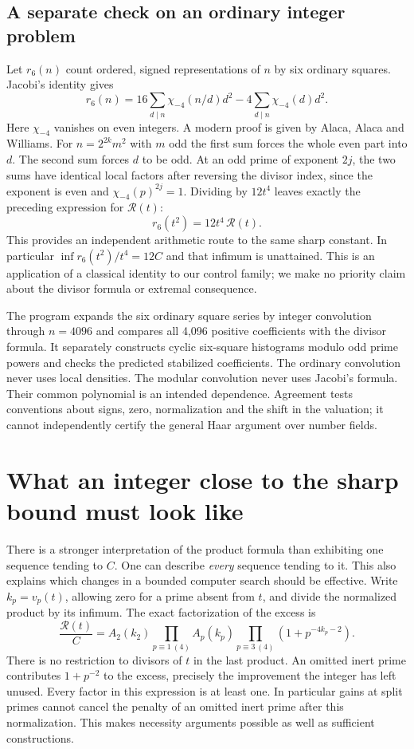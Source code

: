 \documentclass[12pt,letterpaper]{article}
\begin{document}
\subsection{A separate check on an ordinary integer problem}
Let $r_6(n)$ count ordered, signed representations of $n$ by six ordinary squares. Jacobi's identity gives
\[
 r_6(n)=16\sum_{d\mid n}\chi_{-4}(n/d)d^2
              -4\sum_{d\mid n}\chi_{-4}(d)d^2 .
\]
Here $\chi_{-4}$ vanishes on even integers. A modern proof is given by Alaca, Alaca and Williams. For $n=2^{2k}m^2$ with $m$ odd the first sum forces the whole even part into $d$. The second sum forces $d$ to be odd. At an odd prime of exponent $2j$, the two sums have identical local factors after reversing the divisor index, since the exponent is even and $\chi_{-4}(p)^{2j}=1$. Dividing by $12t^4$ leaves exactly the preceding expression for $\mathcal R(t)$:
\[
                  r_6(t^2)=12t^4\,\mathcal R(t).
\]
This provides an independent arithmetic route to the same sharp constant. In particular $\inf r_6(t^2)/t^4=12C$ and that infimum is unattained. This is an application of a classical identity to our control family; we make no priority claim about the divisor formula or extremal consequence.
\par
The program expands the six ordinary square series by integer convolution through $n=4096$ and compares all 4,096 positive coefficients with the divisor formula. It separately constructs cyclic six-square histograms modulo odd prime powers and checks the predicted stabilized coefficients. The ordinary convolution never uses local densities. The modular convolution never uses Jacobi's formula. Their common polynomial is an intended dependence. Agreement tests conventions about signs, zero, normalization and the shift in the valuation; it cannot independently certify the general Haar argument over number fields.

\section{What an integer close to the sharp bound must look like}\label{sec:extremal}
There is a stronger interpretation of the product formula than exhibiting one sequence tending to $C$. One can describe \emph{every} sequence tending to it. This also explains which changes in a bounded computer search should be effective. Write $k_p=v_p(t)$, allowing zero for a prime absent from $t$, and divide the normalized product by its infimum. The exact factorization of the excess is
\begin{equation}\label{eq:excess}
 \frac{\mathcal R(t)}{C}
  =A_2(k_2)
   \prod_{p\equiv1\ (4)} A_p(k_p)
   \prod_{p\equiv3\ (4)}(1+p^{-4k_p-2}).
\end{equation}
There is no restriction to divisors of $t$ in the last product. An omitted inert prime contributes $1+p^{-2}$ to the excess, precisely the improvement the integer has left unused. Every factor in this expression is at least one. In particular gains at split primes cannot cancel the penalty of an omitted inert prime after this normalization. This makes necessity arguments possible as well as sufficient constructions.
\end{document}
